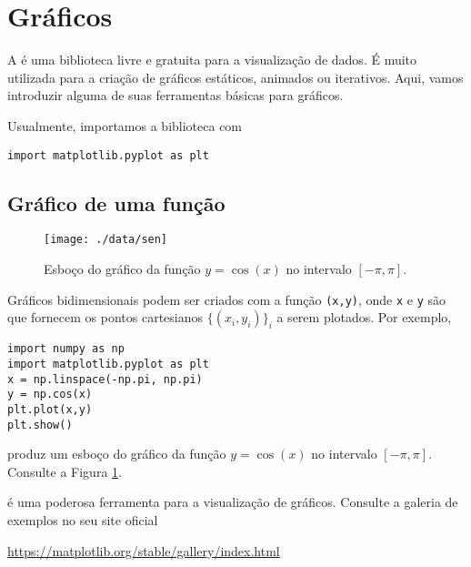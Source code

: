 
\section{Gráficos}\label{sec_graf}

A \hl{\PYTHONmatplotlib} é uma biblioteca {\python} livre e gratuita para a visualização de dados. É muito utilizada para a criação de gráficos estáticos, animados ou iterativos. Aqui, vamos introduzir alguma de suas ferramentas básicas para gráficos.

Usualmente, importamos a biblioteca com

\begin{lstlisting}
import matplotlib.pyplot as plt
\end{lstlisting}

\subsection{Gráfico de uma função}\label{sec_graf_ssec_fun}

\begin{figure}[h]
  \centering
  \texttt{[image: ./data/sen]}
  \caption{Esboço do gráfico da função $y=\cos(x)$ no intervalo $[-\pi,\pi]$.}
  \label{fig:sen}
\end{figure}

Gráficos bidimensionais podem ser criados com a função {\PYTHONmatplotlibDOTpyplotDOTplot}\texttt{(x,y)}, onde \texttt{x} e \texttt{y} são {\PYTHONnumpyDOTarrays} que fornecem os pontos cartesianos $\{(x_i, y_i)\}_{i}$ a serem plotados. Por exemplo,

\begin{lstlisting}
import numpy as np
import matplotlib.pyplot as plt
x = np.linspace(-np.pi, np.pi)
y = np.cos(x)
plt.plot(x,y)
plt.show()
\end{lstlisting}

produz um esboço do gráfico da função $y=\cos(x)$ no intervalo $[-\pi,\pi]$. Consulte a Figura \ref{fig:sen}.


\begin{obs}
  {\PYTHONmatplotlib} é uma poderosa ferramenta para a visualização de gráficos. Consulte a galeria de exemplos no seu site oficial
  \begin{center}
    \url{https://matplotlib.org/stable/gallery/index.html}
  \end{center}
\end{obs}

